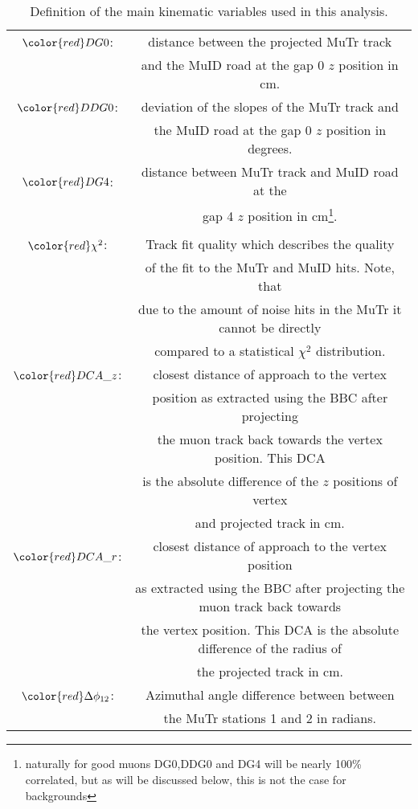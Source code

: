 

\begin{table}[hp]
\begin{center}
\caption{\label{tab:basic_cuts} Definition of the main kinematic variables used in this analysis.}
\begin{tabular}{cc}\\
${\color{red}DG0}$:& distance between the projected MuTr track\\
&  and the MuID road at the gap 0 $z$ position in cm.\\
${\color{red}DDG0}$:& deviation of the slopes of the MuTr track and\\
& the MuID road at the gap 0 $z$ position in degrees.\\
${\color{red}DG4}$:& distance between MuTr track and MuID road at the\\
& gap 4 $z$ position in cm\footnote{naturally for good muons DG0,DDG0 and DG4 will be nearly 100\% correlated, but as will be discussed below, this is not the case for backgrounds}.\\
&\\
${\color{red}\chi^2}$:&Track fit quality which describes the quality\\
&of the fit to the MuTr and MuID hits. Note, that \\
& due to the amount of  noise hits in the MuTr it cannot be directly \\
& compared to a statistical $\chi^2$ distribution.\\
${\color{red}DCA\_z}$:&closest distance of approach to the vertex\\
& position as extracted using the BBC after projecting\\
& the muon track back towards the vertex position. This DCA\\
& is the absolute difference of the $z$ positions of vertex\\
& and projected track in cm.\\
${\color{red}DCA\_r}$:&closest distance of approach to the vertex position\\
& as extracted using the BBC after projecting the muon track back towards\\
& the vertex position. This DCA is the absolute difference of the radius of\\
& the projected track in cm.\\
${\color{red}\Delta \phi_{12}}$:&Azimuthal angle difference between between\\
& the MuTr stations 1 and 2 in radians.\\

\end{tabular}
\end{center}
\end{table}
